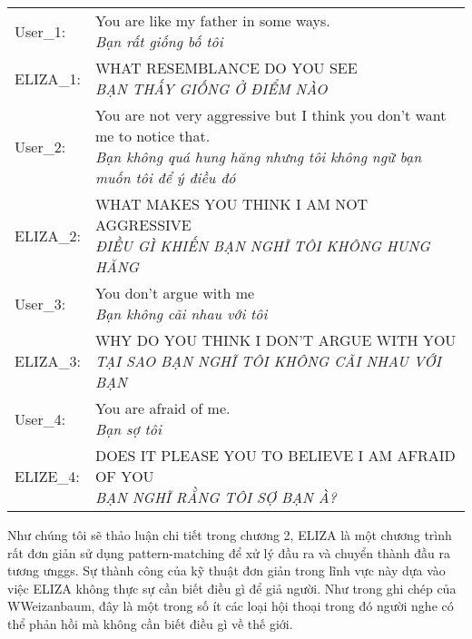 \vspace{0.15cm}
\hspace*{-1cm}
\begin{tabular}{ l l }
  User_1: & \makecell[l]{You are like my father in some ways. \vspace{-0.15cm} \\
    \scriptsize{\textit{Bạn rất giống bố tôi}}}  \\
  ELIZA_1: & \makecell[l]{WHAT RESEMBLANCE DO YOU SEE \vspace{-0.15cm} \\
    \scriptsize{\textit{BẠN THẤY GIỐNG Ở ĐIỂM NÀO}}} \\
  User_2: & \makecell[l]{You are not very aggressive but I think you don't want me to notice that. \vspace{-0.15cm} \\
    \scriptsize{\textit{Bạn không quá hung hăng nhưng tôi không ngữ bạn muốn tôi để ý điều đó }}} \\
  ELIZA_2: & \makecell[l]{WHAT MAKES YOU THINK I AM NOT AGGRESSIVE \vspace{-0.15cm} \\
    \scriptsize{\textit{ĐIỀU GÌ KHIẾN BẠN NGHĨ TÔI KHÔNG HUNG HĂNG}}} \\
  User_3: & \makecell[l]{You don't argue with me \vspace{-0.15cm} \\
    \scriptsize{\textit{Bạn không cãi nhau với tôi}}} \\
  ELIZA_3: & \makecell[l]{WHY DO YOU THINK I DON'T ARGUE WITH YOU \vspace{-0.15cm} \\
    \scriptsize{\textit{TẠI SAO BẠN NGHĨ TÔI KHÔNG CÃI NHAU VỚI BẠN}}} \\
  User_4: & \makecell[l]{You are afraid of me. \vspace{-0.15cm} \\
    \scriptsize{\textit{Bạn sợ tôi}}} \\
  ELIZE_4: & \makecell[l]{DOES IT PLEASE YOU TO BELIEVE I AM AFRAID OF YOU \vspace{-0.15cm} \\
    \scriptsize{\textit{BẠN NGHĨ RẰNG TÔI SỢ BẠN À?}}}
\end{tabular}

Như chúng tôi sẽ thảo luận chi tiết trong chương 2, ELIZA là một chương trình rất đơn giản sử dụng pattern-matching để xử lý đầu ra và chuyển thành đầu ra tương ưnggs. Sự thành công của kỹ thuật đơn giản trong lĩnh vực này dựa vào việc ELIZA không thực sự cần biết điều gì để giả người. Như trong ghi chép của WWeizanbaum, đây là một trong số ít các loại hội thoại trong đó người nghe có thể phản hồi mà không cần biết điều gì về thế giới.

